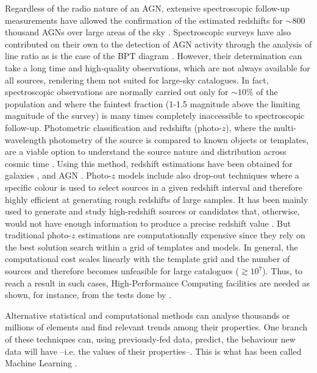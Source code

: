 \documentclass{aa}
\begin{document}
Regardless of the radio nature of an AGN, extensive spectroscopic follow-up measurements have allowed the confirmation of the estimated redshifts for ${\sim} 800$ thousand AGNs over large areas of the sky \citep{2021arXiv210512985F}. Spectroscopic surveys have also contributed on their own to the detection of AGN activity through the analysis of line ratio as is the case of the BPT diagram \citep*{1981PASP...93....5B}. However, their determination can take a long time and high-quality observations, which are not always available for all sources, rendering them not suited for large-sky catalogues. In fact, spectroscopic observations are normally carried out only for ${\sim}10\%$ of the population and where the faintest fraction (1-1.5 magnitude above the limiting magnitude of the survey) is many times completely inaccessible to spectroscopic follow-up. Photometric classification and redshifts (photo-$z$), where the multi-wavelength photometry of the source is compared to known objects or templates, are a viable option to understand the source nature and distribution across cosmic time \citep{1957AJ.....62....6B, 2019NatAs...3..212S}. Using this method, redshift estimations have been obtained for galaxies \citep[e.g.][]{2021A&A...654A.101H}, and AGN \citep[e.g.][]{2017ApJ...850...66A}. Photo-$z$ models include also drop-out techniques where a specific colour is used to select sources in a given redshift interval and therefore highly efficient at generating rough redshifts of large samples. It has been mainly used to generate and study high-redshift sources or candidates that, otherwise, would not have enough information to produce a precise redshift value \citep[e.g.][]{2020ApJ...902..112B, 2020A&A...633A.160C, 2022Shobhana}. But traditional photo-$z$ estimations are computationally expensive since they rely on the best solution search within a grid of templates and models. In general, the computational cost scales linearly with the template grid and the number of sources
and therefore becomes unfeasible for large catalogues (${\gtrsim}10^{7}$). Thus, to reach a result in such cases, High-Performance Computing facilities are needed as shown, for instance, from the tests done by \citet{2021ApJ...916...43G}. 

Alternative statistical and computational methods can analyse thousands or millions of elements and find relevant trends among their properties. One branch of these techniques can, using previously-fed data, predict, the behaviour new data will have --i.e. the values of their properties--. This is what has been called Machine Learning \citep[ML;][]{5392560}.
\end{document}
